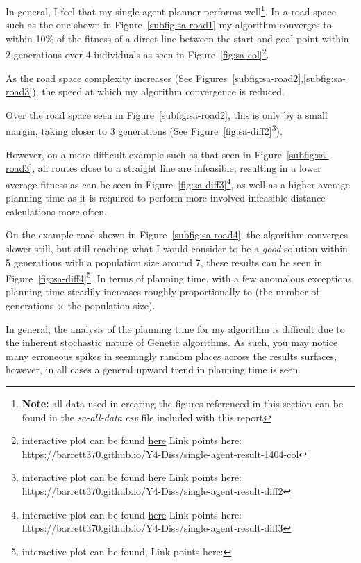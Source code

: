 
In general, I feel that my single agent planner performs well\footnote{\textbf{Note:} all data used in creating the figures referenced in this section can be found in the \textit{sa-all-data.csv} file included with this report }. In a road space such as the one shown in Figure~\ref{subfig:sa-road1} my algorithm converges to within 10\% of the fitness of a direct line between the start and goal point within 2 generations over 4 individuals as seen in Figure~\ref{fig:sa-col}\footnote{interactive plot can be found \href{https://barrett370.github.io/Y4-Diss/single-agent-result-1404-col}{here} Link points here: https://barrett370.github.io/Y4-Diss/single-agent-result-1404-col}.

As the road space complexity increases (See Figures~\ref{subfig:sa-road2},\ref{subfig:sa-road3}), the speed at which my algorithm convergence is reduced.

Over the road space seen in Figure~\ref{subfig:sa-road2}, this is only by a small margin, taking closer to 3 generations (See Figure~\ref{fig:sa-diff2}\footnote{interactive plot can be found \href{https://barrett370.github.io/Y4-Diss/single-agent-result-diff2}{here} Link points here: https://barrett370.github.io/Y4-Diss/single-agent-result-diff2}).

However, on a more difficult example such as that seen in Figure~\ref{subfig:sa-road3}, all routes close to a straight line are infeasible, resulting in a lower average fitness as can be seen in Figure~\ref{fig:sa-diff3}\footnote{interactive plot can be found \href{https://barrett370.github.io/Y4-Diss/single-agent-result-diff3}{here} Link points here: https://barrett370.github.io/Y4-Diss/single-agent-result-diff3}, as well as a higher average planning time as it is required to perform more involved infeasible distance calculations more often.

On the example road shown in Figure~\ref{subfig:sa-road4}, the algorithm converges slower still, but still reaching what I would consider to be a \textit{good} solution within 5 generations with a population size around 7, these results can be seen in Figure~\ref{fig:sa-diff4}\footnote{interactive plot can be found, Link points here:}. In terms of planning time, with a few anomalous exceptions planning time steadily increases roughly proportionally to (the number of generations $\times$ the population size).

In general, the analysis of the planning time for my algorithm is difficult due to the inherent stochastic nature of Genetic algorithms. As such, you may notice many erroneous spikes in seemingly random places across the results surfaces, however, in all cases a general upward trend in planning time is seen.

